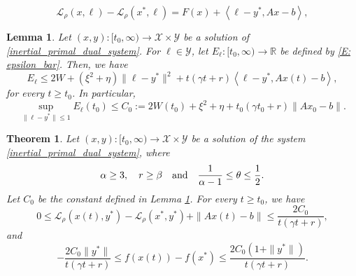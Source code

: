 \documentclass[10pt,a4paper]{amsart}
\newtheorem{lemma}{Lemma}
\newtheorem{theorem}{Theorem}
\newcommand{\R}{\mathbb{R}}
\newcommand{\X}{\mathcal{X}}
\newcommand{\Y}{\mathcal{Y}}
\newcommand{\qbox}[1]{\quad\hbox{#1}\quad}
\begin{document}
\begin{equation}\label{E: Lagrangian_bar}
\mathcal{L}_\rho\left(x,\ell\right) - \mathcal{L}_\rho(x^*,\ell) = F(x) 
  + \left\langle \ell - y^*, Ax-b \right\rangle,
\end{equation}

\begin{lemma}\label{Lem: epsilon_bar}
Let $(x,y):[t_0,\infty)\to\X\times\Y$ be a solution of \eqref{inertial_primal_dual_system}. For $\ell\in\Y$, let $E_\ell:[t_0,\infty)\to\R$ be defined by \eqref{E: epsilon_bar}. Then, we have
\begin{equation*}
E_\ell \le 2W + (\xi^2 + \eta)\| \ell - y^*\|^2 + t(\gamma t + r)\left\langle \ell - y^*, Ax(t)-b \right\rangle,
\end{equation*}
for every $t\ge t_0$. In particular,
$$\sup_{\|\ell-y^*\|\le 1} E_\ell(t_0) \le C_0:=2W(t_0) + \xi^2 + \eta + t_0(\gamma t_0 + r) \| Ax_0-b \|.$$
\end{lemma}

\begin{theorem} \label{T:rates}
Let $(x,y):[t_0,\infty)\to\X\times\Y$ be a solution of the system \eqref{inertial_primal_dual_system}, where
$$ \alpha\ge 3,\quad r\ge\beta \qbox{and} \frac{1}{\alpha-1}\le \theta \le \frac{1}{2}.$$
Let $C_0$ be the constant defined in Lemma \ref{Lem: epsilon_bar}. For every $t\ge t_0$, we have
\begin{equation} \label{E:main_thm}
    0\le \mathcal{L}_\rho\left(x(t),y^*\right) - \mathcal{L}_\rho(x^*,y^*) + \|Ax(t)-b\| \le \frac{2C_0}{t(\gamma t + r)},
\end{equation}
and
$$ -\frac{2C_0 \| y^* \| }{t(\gamma t + r)} \le f\left( x(t) \right) - f(x^*) \le \frac{2C_0 \left(1+\|y^* \|\right)}{t(\gamma t + r)}. $$
\end{theorem}
\end{document}
